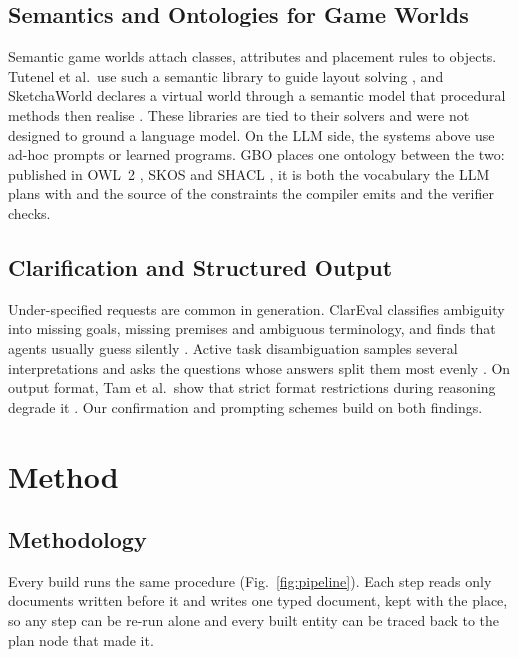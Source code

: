 \documentclass[conference]{IEEEtran}
\begin{document}
\subsection{Semantics and Ontologies for Game Worlds}
Semantic game worlds attach classes, attributes and placement rules to objects.
Tutenel et al.\ use such a semantic library to guide layout solving \cite{tutenel2009},
and SketchaWorld declares a virtual world through a semantic model that procedural
methods then realise \cite{smelik2011}. These libraries are tied to their solvers and
were not designed to ground a language model. On the LLM side, the systems above use
ad-hoc prompts or learned programs. GBO places one ontology between the two: published
in OWL~2 \cite{owl2}, SKOS \cite{skos} and SHACL \cite{shacl}, it is both the vocabulary
the LLM plans with and the source of the constraints the compiler emits and the
verifier checks.

\subsection{Clarification and Structured Output}
Under-specified requests are common in generation. ClarEval classifies ambiguity into
missing goals, missing premises and ambiguous terminology, and finds that agents usually
guess silently \cite{clareval}. Active task disambiguation samples several
interpretations and asks the questions whose answers split them most evenly
\cite{kobalczyk2025}. On output format, Tam et al.\ show that strict format restrictions
during reasoning degrade it \cite{tam2024}. Our confirmation and prompting schemes build
on both findings.

\section{Method}

\subsection{Methodology}

Every build runs the same procedure (Fig.~\ref{fig:pipeline}). Each step reads only
documents written before it and writes one typed document, kept with the place, so any
step can be re-run alone and every built entity can be traced back to the plan node that
made it.
\end{document}
